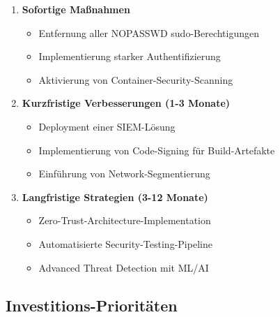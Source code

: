 \documentclass[11pt,a4paper]{article}
\begin{document}
\begin{enumerate}[leftmargin=*]
    \item \textbf{Sofortige Maßnahmen}
    \begin{itemize}
        \item Entfernung aller NOPASSWD sudo-Berechtigungen
        \item Implementierung starker Authentifizierung
        \item Aktivierung von Container-Security-Scanning
    \end{itemize}
    
    \item \textbf{Kurzfristige Verbesserungen (1-3 Monate)}
    \begin{itemize}
        \item Deployment einer SIEM-Lösung
        \item Implementierung von Code-Signing für Build-Artefakte
        \item Einführung von Network-Segmentierung
    \end{itemize}
    
    \item \textbf{Langfristige Strategien (3-12 Monate)}
    \begin{itemize}
        \item Zero-Trust-Architecture-Implementation
        \item Automatisierte Security-Testing-Pipeline
        \item Advanced Threat Detection mit ML/AI
    \end{itemize}
\end{enumerate}

\subsection{Investitions-Prioritäten}
\end{document}
